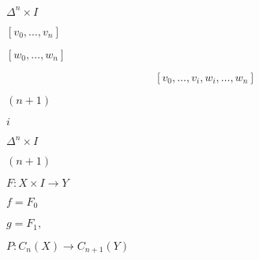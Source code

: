 \documentclass[10pt]{book}
\begin{document}
\begin{mdSnippets}
\begin{mdInlineSnippet}[1341e2772acf002a68e1fb9de246aa3d]%
$\Delta^n \times I$\end{mdInlineSnippet}%
\begin{mdInlineSnippet}%
$[v_0, \dots, v_n]$\end{mdInlineSnippet}%
\begin{mdInlineSnippet}[8db4d2c437d6a616ae0c835ee77bbad4]%
$[w_0, \dots, w_n]$\end{mdInlineSnippet}%
\begin{mdDisplaySnippet}%
\[%
[v_0, \dots, v_i, w_i, \dots, w_n]
\]%
\end{mdDisplaySnippet}%
\begin{mdInlineSnippet}%
$(n+1)$\end{mdInlineSnippet}%
\begin{mdInlineSnippet}[865c0c0b4ab0e063e5caa3387c1a8741]%
$i$\end{mdInlineSnippet}%
\begin{mdInlineSnippet}[1341e2772acf002a68e1fb9de246aa3d]%
$\Delta^n \times I$\end{mdInlineSnippet}%
\begin{mdInlineSnippet}%
$(n+1)$\end{mdInlineSnippet}%
\begin{mdInlineSnippet}[b6d9f9c512822dc16c3713968e350e50]%
$F: X \times I \to Y$\end{mdInlineSnippet}%
\begin{mdInlineSnippet}[a08d932e48f342e9aa8d14af43dc0019]%
$f = F_0$\end{mdInlineSnippet}%
\begin{mdInlineSnippet}[b513de97680c5dd2552e500cc42f5ddf]%
$g = F_1,$\end{mdInlineSnippet}%
\begin{mdInlineSnippet}%
$P: C_n(X) \to C_{n+1}(Y)$\end{mdInlineSnippet}%
\begin{mdDisplaySnippet}[51abad51c57ee8e8f7a60e8a51f4a15c]%

\end{mdDisplaySnippet}
\end{mdSnippets}
\end{document}
